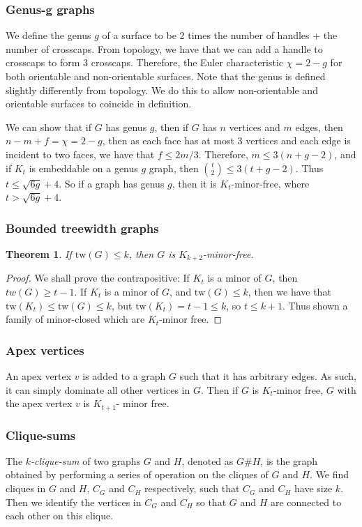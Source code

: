 \documentclass[]{article}
\newcommand{\tw}{\text{tw}}
\newtheorem{theorem}{Theorem}
\theoremstyle{definition}
\numberwithin{theorem}{section}
\numberwithin{equation}{section}
\begin{document}
\subsubsection{Genus-g graphs}
We define the genus $g$ of a surface to be 2 times the number of handles + the number of crosscaps. From topology, we have that we can add a handle to crosscaps to form 3 crosscaps. Therefore, the Euler characteristic $\chi = 2 - g$ for both orientable and non-orientable surfaces. Note that the genus is defined slightly differently from topology. We do this to allow non-orientable and orientable surfaces to coincide in definition.

We can show that if $G$ has genus $g$, then if $G$ has $n$ vertices and $m$ edges, then $n - m + f = \chi = 2-g$, then as each face has at most 3 vertices and each edge is incident to two faces, we have that $f \leq 2m/3$. Therefore, $m \leq 3(n + g - 2)$, and if $K_t$ is embeddable on a genus $g$ graph, then $\binom{t}{2} \leq 3 (t + g - 2)$. Thus $t \leq \sqrt{6g} + 4$. So if a graph has genus $g$, then it is $K_t$-minor-free, where $t > \sqrt{6g} + 4$. 

\subsubsection{Bounded treewidth graphs}
\begin{theorem}
	If $\tw(G) \leq k$, then $G$ is $K_{k+2}$-minor-free. 
\end{theorem}
\begin{proof}
	We shall prove the contrapositive: If $K_t$ is a minor of $G$, then $tw(G) \geq t-1$.
	If $K_t$ is a minor of $G$, and $\tw(G) \leq k$, then we have that $\tw(K_t) \leq \tw(G) \leq k$, but $\tw(K_t) = t-1 \leq k$, so $t \leq k + 1$. Thus shown a family of minor-closed which are $K_t$-minor free. 
\end{proof}
\subsubsection{Apex vertices}
An apex vertex $v$ is added to a graph $G$ such that it has arbitrary edges. As such, it can simply dominate all other vertices in $G$. Then if $G$ is $K_t$-minor free, $G$ with the apex vertex $v$ is $K_{t+1}$- minor free. 
\subsubsection{Clique-sums}
The \textit{$k$-clique-sum} of two graphs $G$ and $H$, denoted as $G \# H$, is the graph obtained by performing a series of operation on the cliques of $G$ and $H$. We find cliques in $G$ and $H$, $C_G$ and $C_H$ respectively, such that $C_G$ and $C_H$ have size $k$. Then we identify the vertices in $C_G$ and $C_H$ so that $G$ and $H$ are connected to each other on this clique. 
\end{document}
